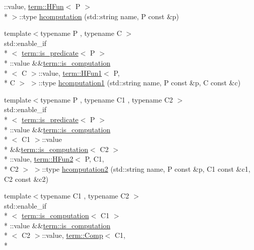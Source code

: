 \begin{DoxyCompactItemize}
\-::value, \hyperlink{structpfq__lang_1_1term_1_1HFun}{term\-::\-H\-Fun}$<$ P $>$\\*
 $>$\-::type \hyperlink{namespacepfq__lang_aabfd9ddf8afda95bb20b5668024eff31}{hcomputation} (std\-::string name, P const \&p)
\item 
{\footnotesize template$<$typename P , typename C $>$ }\\std\-::enable\-\_\-if\\*
$<$ \hyperlink{structpfq__lang_1_1term_1_1is__predicate}{term\-::is\-\_\-predicate}$<$ P $>$\\*
\-::value \&\&\hyperlink{structpfq__lang_1_1term_1_1is__computation}{term\-::is\-\_\-computation}\\*
$<$ C $>$\-::value, \hyperlink{structpfq__lang_1_1term_1_1HFun1}{term\-::\-H\-Fun1}$<$ P, \\*
C $>$ $>$\-::type \hyperlink{namespacepfq__lang_a778ddb4e54e9a8f8c31af25ab08fa131}{hcomputation1} (std\-::string name, P const \&p, C const \&c)
\item 
{\footnotesize template$<$typename P , typename C1 , typename C2 $>$ }\\std\-::enable\-\_\-if\\*
$<$ \hyperlink{structpfq__lang_1_1term_1_1is__predicate}{term\-::is\-\_\-predicate}$<$ P $>$\\*
\-::value \&\&\hyperlink{structpfq__lang_1_1term_1_1is__computation}{term\-::is\-\_\-computation}\\*
$<$ C1 $>$\-::value \\*
\&\&\hyperlink{structpfq__lang_1_1term_1_1is__computation}{term\-::is\-\_\-computation}$<$ C2 $>$\\*
\-::value, \hyperlink{structpfq__lang_1_1term_1_1HFun2}{term\-::\-H\-Fun2}$<$ P, C1, \\*
C2 $>$ $>$\-::type \hyperlink{namespacepfq__lang_a0f3e7007ec3c6cbec92fda3f6e0de6bf}{hcomputation2} (std\-::string name, P const \&p, C1 const \&c1, C2 const \&c2)
\item 
{\footnotesize template$<$typename C1 , typename C2 $>$ }\\std\-::enable\-\_\-if\\*
$<$ \hyperlink{structpfq__lang_1_1term_1_1is__computation}{term\-::is\-\_\-computation}$<$ C1 $>$\\*
\-::value \&\&\hyperlink{structpfq__lang_1_1term_1_1is__computation}{term\-::is\-\_\-computation}\\*
$<$ C2 $>$\-::value, \hyperlink{structpfq__lang_1_1term_1_1Comp}{term\-::\-Comp}$<$ C1, \\*

\end{DoxyCompactItemize}
